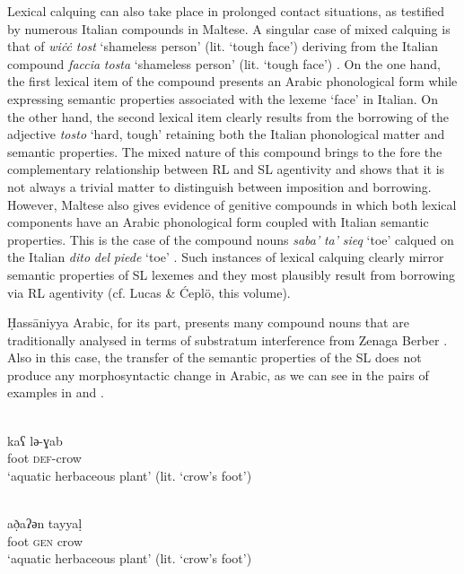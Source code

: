 \documentclass[output=paper]{langsci/langscibook}
\begin{document}
Lexical calquing can also take place in prolonged contact situations, as testified by numerous Italian compounds in Maltese. A singular case of mixed calquing is that of \textit{wi\.c\.c} \textit{tost} ‘shameless person’ (lit. ‘tough face’) deriving from the Italian compound \textit{faccia} \textit{tosta} ‘shameless person’ (lit. ‘tough face’) \citep{Aquilina1987}. On the one hand, the first lexical item of the compound presents an Arabic phonological form while expressing semantic properties associated with the lexeme ‘face’ in Italian. On the other hand, the second lexical item clearly results from the borrowing of the adjective \textit{tosto} ‘hard, tough’ retaining both the Italian phonological matter and semantic properties. The mixed nature of this compound brings to the fore the complementary relationship between RL and SL agentivity and shows that it is not always a trivial matter to distinguish between imposition and borrowing. However, Maltese also gives evidence of genitive compounds in which both lexical components have an Arabic phonological form coupled with Italian semantic properties. This is the case of the compound nouns \textit{saba'} \textit{ta'} \textit{sieq} ‘toe’ calqued on the Italian \textit{dito} \textit{del} \textit{piede} ‘toe’ \citep{Pepperforthcoming}. Such instances of lexical calquing clearly mirror semantic properties of SL lexemes and they most plausibly result from borrowing via RL agentivity (cf. Lucas \& Ćeplö, this volume). 

Ḥassāniyya Arabic, for its part, presents many compound nouns that are traditionally analysed in terms of substratum interference from Zenaga Berber \citep{Taine-Cheikh2008chapter,Taine-Cheikh2012}. Also in this case, the transfer of the semantic properties of the SL does not produce any morphosyntactic change in Arabic, as we can see in the pairs of examples in  and .

\ea\label{ex:crow}
\\
\gll   k{\R}aʕ lә-ɣ{\R}ab  \\
       foot \textsc{def}-crow\\
\glt   `aquatic herbaceous plant' (lit.  ‘crow’s foot’)

\\
\gll   að̣aʔ\R әn tayyaḷ \\
       foot \textsc{gen} crow \\
\glt   `aquatic herbaceous plant' (lit. ‘crow’s foot’)
\z
\z
\end{document}
